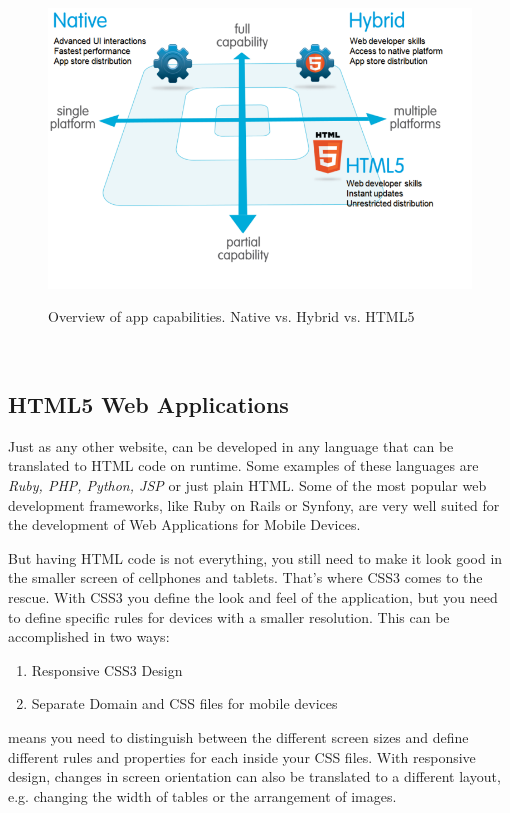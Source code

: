 \begin{figure}[H]
    \begin{center}
        {\includegraphics[width=1\linewidth]{gfx/Native_html5_hybrid}}
        \caption[Overview of app capabilities. Native vs. Hybrid vs. HTML5]{Overview of app capabilities. Native vs. Hybrid vs. HTML5\footnotemark}\label{fig:hybrid_native}
    \end{center}
\end{figure}
\\

\subsection{HTML5 Web Applications}\label{sec:web_app}
Just as any other website,  can be developed in any language that can be translated to HTML code on runtime. Some examples of these languages are \emph{Ruby, PHP, Python, JSP} or just plain HTML. Some of the most popular web development frameworks, like Ruby on Rails or Synfony, are very well suited for the development of Web Applications for Mobile Devices.


But having HTML code is not everything, you still need to make it look good in the smaller screen of cellphones and tablets. That's where CSS3 comes to the rescue. With CSS3 you define the look and feel of the application, but you need to define specific rules for devices with a smaller resolution. This can be accomplished in two ways:
\begin{enumerate}
    \item Responsive CSS3 Design
    \item Separate Domain and CSS files for mobile devices
\end{enumerate}
 means you need to distinguish between the different screen sizes and define different rules and properties for each inside your CSS files. With responsive design, changes in screen orientation can also be translated to a different layout, e.g. changing the width of tables or the arrangement of images.


